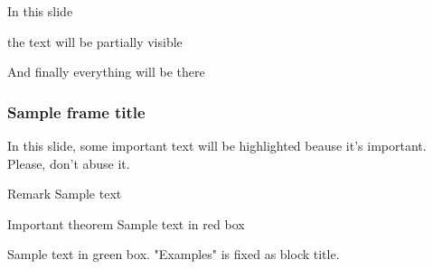 \documentclass{beamer}
\begin{document}
{
\begin{frame}
 In this slide \pause
 
 the text will be partially visible \pause
 
 And finally everything will be there
\end{frame}
}


\begin{frame}
	\frametitle{Sample frame title}
	 
	In this slide, some important text will be
	\alert{highlighted} beause it's important.
	Please, don't abuse it.
	 
	\begin{block}{Remark}
		Sample text
	\end{block}
	 
	\begin{alertblock}{Important theorem}
		Sample text in red box
	\end{alertblock}
	 
	\begin{remark}
		Sample text in green box. "Examples" is fixed as block title.
	\end{remark}
\end{frame}
 
\end{document}
